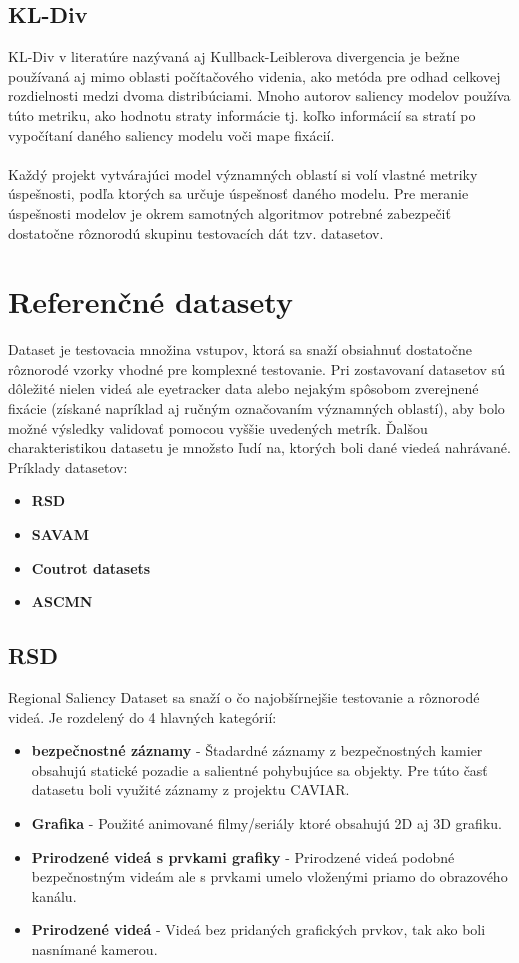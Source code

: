 \subsection{KL-Div}
KL-Div v literatúre nazývaná aj Kullback-Leiblerova divergencia\cite{kldiv} je bežne používaná aj mimo oblasti počítačového videnia, ako metóda pre odhad celkovej rozdielnosti medzi dvoma distribúciami.
Mnoho autorov saliency modelov používa túto metriku, ako hodnotu straty informácie tj. koľko informácií sa stratí po vypočítaní daného saliency modelu voči mape fixácií.
\\\\
Každý projekt vytvárajúci model významných oblastí si volí vlastné metriky úspešnosti, podľa ktorých sa určuje úspešnosť daného modelu.
Pre meranie úspešnosti modelov je okrem samotných algoritmov potrebné zabezpečiť dostatočne rôznorodú skupinu testovacích dát tzv. datasetov.

\section{Referenčné datasety}
Dataset je testovacia množina vstupov, ktorá sa snaží obsiahnuť dostatočne rôznorodé vzorky vhodné pre komplexné testovanie.
Pri zostavovaní datasetov sú dôležité nielen videá ale eyetracker data alebo nejakým spôsobom zverejnené fixácie (získané napríklad aj ručným označovaním významných oblastí), aby bolo možné výsledky validovať pomocou vyššie uvedených metrík.
Ďalšou charakteristikou datasetu je množsto ľudí na, ktorých boli dané viedeá nahrávané.
\\ Príklady datasetov:
\begin{itemize}
	\item \textbf{RSD}\cite{rsd}
	\item \textbf{SAVAM}\cite{savam}
	\item \textbf{Coutrot datasets}\cite{courot-dataset}
  \item \textbf{ASCMN}\cite{accv}
\end{itemize}

\subsection{RSD}
Regional Saliency Dataset sa snaží o čo najobšírnejšie testovanie a rôznorodé videá.
Je rozdelený do 4 hlavných kategórií:
\begin{itemize}
	\item \textbf{bezpečnostné záznamy} - Štadardné záznamy z bezpečnostných kamier obsahujú statické pozadie a salientné pohybujúce sa objekty.
Pre túto časť datasetu boli využité záznamy z projektu CAVIAR\cite{rsd-caviar}.
	\item \textbf{Grafika} - Použité animované filmy/seriály ktoré obsahujú 2D aj 3D grafiku.
  \item \textbf{Prirodzené videá s prvkami grafiky} - Prirodzené videá  podobné bezpečnostným videám ale s prvkami umelo vloženými priamo do obrazového kanálu.
  \item \textbf{Prirodzené videá} - Videá bez pridaných grafických prvkov, tak ako boli nasnímané kamerou.
\end{itemize}

